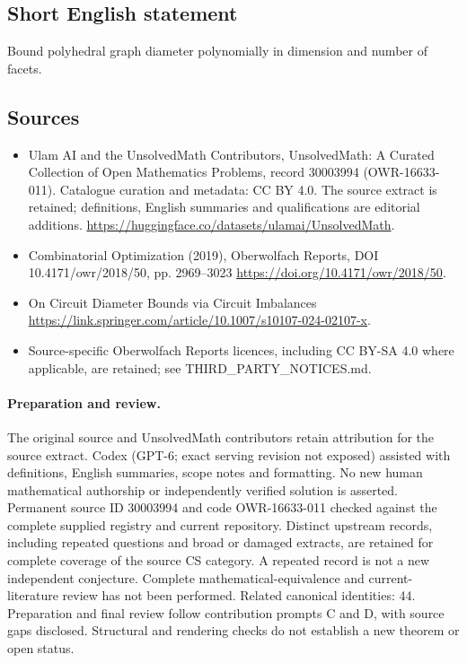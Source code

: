 \documentclass[11pt]{article}
\begin{document}
\subsection{Short English statement}
Bound polyhedral graph diameter polynomially in dimension and number of facets.
\subsection{Sources}
\begin{itemize}
\item[\hypertarget{source:30003994:1}{S1}] Ulam AI and the UnsolvedMath Contributors, UnsolvedMath: A Curated Collection of Open Mathematics Problems, record 30003994 (OWR-16633-011). Catalogue curation and metadata: CC BY 4.0. The source extract is retained; definitions, English summaries and qualifications are editorial additions.
\url{https://huggingface.co/datasets/ulamai/UnsolvedMath}.
\item[\hypertarget{source:30003994:2}{S2}] Combinatorial Optimization (2019), Oberwolfach Reports, DOI 10.4171/owr/2018/50, pp. 2969--3023
\url{https://doi.org/10.4171/owr/2018/50}.
\item[\hypertarget{source:30003994:3}{S3}] On Circuit Diameter Bounds via Circuit Imbalances
\url{https://link.springer.com/article/10.1007/s10107-024-02107-x}.
\item Source-specific Oberwolfach Reports licences, including CC BY-SA 4.0 where applicable, are retained; see THIRD\_PARTY\_NOTICES.md.
\end{itemize}
\paragraph{Preparation and review.}
The original source and UnsolvedMath contributors retain attribution for the source extract. Codex (GPT-6; exact serving revision not exposed) assisted with definitions, English summaries, scope notes and formatting. No new human mathematical authorship or independently verified solution is asserted. Permanent source ID 30003994 and code OWR-16633-011 checked against the complete supplied registry and current repository. Distinct upstream records, including repeated questions and broad or damaged extracts, are retained for complete coverage of the source CS category. A repeated record is not a new independent conjecture. Complete mathematical-equivalence and current-literature review has not been performed. Related canonical identities: 44. Preparation and final review follow contribution prompts C and D, with source gaps disclosed. Structural and rendering checks do not establish a new theorem or open status.
\label{end:30003994}
\end{document}
